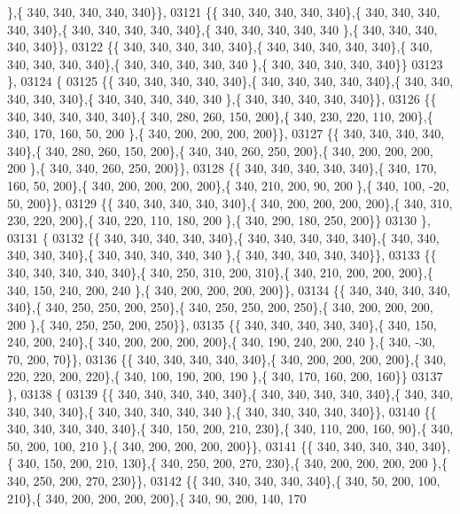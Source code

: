 \begin{DoxyCode}
      \},\{ 340, 340, 340, 340, 340\}\},
03121 \{\{ 340, 340, 340, 340, 340\},\{ 340, 340, 340, 340, 340\},\{ 340, 340, 340, 340, 340\},\{ 340, 340, 340, 340, 340
      \},\{ 340, 340, 340, 340, 340\}\},
03122 \{\{ 340, 340, 340, 340, 340\},\{ 340, 340, 340, 340, 340\},\{ 340, 340, 340, 340, 340\},\{ 340, 340, 340, 340, 340
      \},\{ 340, 340, 340, 340, 340\}\}
03123 \},
03124 \{
03125 \{\{ 340, 340, 340, 340, 340\},\{ 340, 340, 340, 340, 340\},\{ 340, 340, 340, 340, 340\},\{ 340, 340, 340, 340, 340
      \},\{ 340, 340, 340, 340, 340\}\},
03126 \{\{ 340, 340, 340, 340, 340\},\{ 340, 280, 260, 150, 200\},\{ 340, 230, 220, 110, 200\},\{ 340, 170, 160,  50, 200
      \},\{ 340, 200, 200, 200, 200\}\},
03127 \{\{ 340, 340, 340, 340, 340\},\{ 340, 280, 260, 150, 200\},\{ 340, 340, 260, 250, 200\},\{ 340, 200, 200, 200, 200
      \},\{ 340, 340, 260, 250, 200\}\},
03128 \{\{ 340, 340, 340, 340, 340\},\{ 340, 170, 160,  50, 200\},\{ 340, 200, 200, 200, 200\},\{ 340, 210, 200,  90, 200
      \},\{ 340, 100, -20,  50, 200\}\},
03129 \{\{ 340, 340, 340, 340, 340\},\{ 340, 200, 200, 200, 200\},\{ 340, 310, 230, 220, 200\},\{ 340, 220, 110, 180, 200
      \},\{ 340, 290, 180, 250, 200\}\}
03130 \},
03131 \{
03132 \{\{ 340, 340, 340, 340, 340\},\{ 340, 340, 340, 340, 340\},\{ 340, 340, 340, 340, 340\},\{ 340, 340, 340, 340, 340
      \},\{ 340, 340, 340, 340, 340\}\},
03133 \{\{ 340, 340, 340, 340, 340\},\{ 340, 250, 310, 200, 310\},\{ 340, 210, 200, 200, 200\},\{ 340, 150, 240, 200, 240
      \},\{ 340, 200, 200, 200, 200\}\},
03134 \{\{ 340, 340, 340, 340, 340\},\{ 340, 250, 250, 200, 250\},\{ 340, 250, 250, 200, 250\},\{ 340, 200, 200, 200, 200
      \},\{ 340, 250, 250, 200, 250\}\},
03135 \{\{ 340, 340, 340, 340, 340\},\{ 340, 150, 240, 200, 240\},\{ 340, 200, 200, 200, 200\},\{ 340, 190, 240, 200, 240
      \},\{ 340, -30,  70, 200,  70\}\},
03136 \{\{ 340, 340, 340, 340, 340\},\{ 340, 200, 200, 200, 200\},\{ 340, 220, 220, 200, 220\},\{ 340, 100, 190, 200, 190
      \},\{ 340, 170, 160, 200, 160\}\}
03137 \},
03138 \{
03139 \{\{ 340, 340, 340, 340, 340\},\{ 340, 340, 340, 340, 340\},\{ 340, 340, 340, 340, 340\},\{ 340, 340, 340, 340, 340
      \},\{ 340, 340, 340, 340, 340\}\},
03140 \{\{ 340, 340, 340, 340, 340\},\{ 340, 150, 200, 210, 230\},\{ 340, 110, 200, 160,  90\},\{ 340,  50, 200, 100, 210
      \},\{ 340, 200, 200, 200, 200\}\},
03141 \{\{ 340, 340, 340, 340, 340\},\{ 340, 150, 200, 210, 130\},\{ 340, 250, 200, 270, 230\},\{ 340, 200, 200, 200, 200
      \},\{ 340, 250, 200, 270, 230\}\},
03142 \{\{ 340, 340, 340, 340, 340\},\{ 340,  50, 200, 100, 210\},\{ 340, 200, 200, 200, 200\},\{ 340,  90, 200, 140, 170

\end{DoxyCode}
